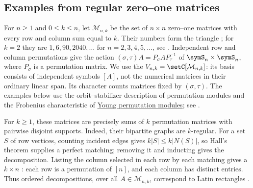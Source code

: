 




\subsection[regularMatrixModules]{Examples from regular zero--one matrices}

For $n\geq1$ and $0\leq k\leq n$, let $\mathcal M_{n,k}$ be the set
of $n\times n$ zero--one matrices with every row and column sum equal to $k$.
Their numbers form the triangle ; for $k=2$ they are
$1,6,90,2040,\dotsc$ for $n=2,3,4,5,\dotsc$, see .
Independent row and column permutations give the action
$(\sigma,\tau)A=P_\sigma A P_\tau^{-1}$ of
$\symS_n\times\symS_n$, where $P_\sigma$ is a permutation matrix.
We use the 
$V_{n,k}=\setC[\mathcal M_{n,k}]$: its basis consists of independent symbols
$[A]$, not the numerical matrices in their ordinary linear span.
Its character counts matrices fixed by $(\sigma,\tau)$.
The examples below use the orbit--stabilizer description of permutation
modules and the Frobenius characteristic of
\hyperref[spechtTabloids]{Young permutation modules}; see \cite{Sagan2001}.

For $k\geq1$, these matrices are precisely sums of $k$ permutation matrices
with pairwise disjoint supports. Indeed, their bipartite graphs are
$k$-regular. For a set $S$ of row vertices, counting incident edges gives
$k|S|\leq k|N(S)|$, so Hall's theorem supplies a perfect matching;
removing it and inducting gives the decomposition.
Listing the column selected in each row by each matching gives a
$k\times n$ : each row is a permutation of $[n]$,
and each column has distinct entries. Thus ordered decompositions, over all
$A\in\mathcal M_{n,k}$, correspond to Latin rectangles
\cite[Sec.~1]{Wanless1999}.

